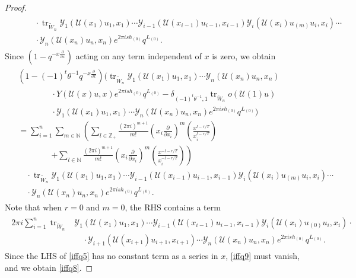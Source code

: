 \documentclass[10pt,a4paper]{amsart}
\newcommand{\Y}{\mathcal{Y}}
\begin{document}
\begin{proof}
\begin{align}
\begin{split}
  &\quad\quad\cdot
    \operatorname{tr}_{\tilde{W}_n}
    \Y_1(\mathcal{U}(x_1)u_1,x_1) \cdots
    \Y_{i-1}(\mathcal{U}(x_{i-1})u_{i-1},x_{i-1})
    \Y_i(\mathcal{U}(x_i)u_{(m)}u_i,x_i) \cdots \\
  &\quad\quad\cdot
    \Y_n(\mathcal{U}(x_n)u_n,x_n) e^{2\pi i s h_{(0)}} q^{L_{(0)}}.
\end{split}
\end{align}
Since \( \left(1 - q^{-x\frac{\partial}{\partial x}}\right) \) acting on any term independent of \( x \) is zero, we obtain
\begin{align}\label{iffq5}
\begin{split}
  &\left(1 - (-1)^t \theta^{-1} q^{-x\frac{\partial}{\partial x}}\right)
    \Bigg(
      \operatorname{tr}_{\tilde{W}_n}
      \Y_1(\mathcal{U}(x_1)u_1,x_1) \cdots \Y_n(\mathcal{U}(x_n)u_n,x_n) \\
  &\quad\quad\quad\quad
      \cdot Y(\mathcal{U}(x)u,x) e^{2\pi i s h_{(0)}} q^{L_{(0)}} 
      - \delta_{(-1)^t\theta^{-1},1}
      \operatorname{tr}_{\tilde{W}_n} o(\mathcal{U}(1)u) \\
  &\quad\quad\quad\quad
      \cdot \Y_1(\mathcal{U}(x_1)u_1,x_1) \cdots \Y_n(\mathcal{U}(x_n)u_n,x_n)
      e^{2\pi i s h_{(0)}} q^{L_{(0)}}
    \Bigg) \\
  &=
    \sum_{i=1}^{n} \sum_{m \in \mathbb{N}}
    \left(
      \sum_{l \in \mathbb{Z}_+}
      \frac{(2\pi i)^{m+1}}{m!}
      \left(x_i \frac{\partial}{\partial x_i}\right)^m
      \left(\frac{x^{l - r/T}}{x_i^{l - r/T}}\right) \right. \\
  &\quad\quad\quad\quad\left.
      +
      \sum_{l \in \mathbb{N}}
      \frac{(2\pi i)^{m+1}}{m!}
      \left(x_i \frac{\partial}{\partial x_i}\right)^m
      \left(\frac{x^{-l - r/T}}{x_i^{-l - r/T}}\right)
    \right) \\
  &\quad\cdot
    \operatorname{tr}_{\tilde{W}_n}
    \Y_1(\mathcal{U}(x_1)u_1,x_1) \cdots
    \Y_{i-1}(\mathcal{U}(x_{i-1})u_{i-1},x_{i-1})
    \Y_i(\mathcal{U}(x_i)u_{(m)}u_i,x_i) \cdots \\
  &\quad\cdot
    \Y_n(\mathcal{U}(x_n)u_n,x_n)
    e^{2\pi i s h_{(0)}} q^{L_{(0)}}.
\end{split}
\end{align}
Note that when \( r = 0 \) and \( m = 0 \), the RHS contains a term
\begin{align}\label{iffq9}
\begin{split}
  2\pi i \sum_{i=1}^{n} \operatorname{tr}_{\tilde{W}_n}&
  \Y_1(\mathcal{U}(x_{1})u_{1},x_{1}) \cdots 
  \Y_{i-1}(\mathcal{U}(x_{i-1})u_{i-1},x_{i-1})
  \Y_i(\mathcal{U}(x_{i})u_{(0)}u_{i},x_{i}) \cdot\\
  &\quad\cdot 
  \Y_{i+1}(\mathcal{U}(x_{i+1})u_{i+1},x_{i+1}) \cdots 
  \Y_n(\mathcal{U}(x_{n})u_{n},x_{n})
  e^{2\pi i s h_{(0)}} q^{L_{(0)}}.
\end{split}
\end{align}
Since the LHS of \eqref{iffq5} has no constant term as a series in \( x \), \eqref{iffq9} must vanish, and we obtain \eqref{iffq8}.


\end{proof}
\end{document}
